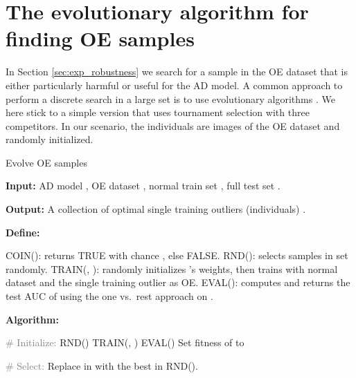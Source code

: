 \documentclass[10pt]{article} \usepackage[accepted]{stylefiles/tmlr}
\newcommand{\algcom}[1]{\textcolor{gray}{\# {#1}}}
\begin{document}
\section{The evolutionary algorithm for finding OE samples} \label{appx:evol_algo}

In Section \ref{sec:exp_robustness} we search for a sample in the OE dataset that is either particularly harmful or useful for the AD model. 
A common approach to perform a discrete search in a large set is to use evolutionary algorithms \citep{yu2010introduction, fortin2012deap}.
We here stick to a simple version that uses tournament selection \citep{blickle1995mathematical} with three competitors.
In our scenario, the individuals are images of the OE dataset and randomly initialized.

\begin{algorithm}[H]
    \footnotesize
    \caption{Evolve OE samples}
    \label{alg:evolve}
    
    \textbf{Input:} AD model , OE dataset , normal train set , full test set . \hfill \hphantom{1em}
    
    \textbf{Output:} A collection of optimal single training outliers (individuals) . \hfill \hphantom{1em}
    
    \textbf{Define:} 
    \begin{algorithmic}
        \STATE COIN(): returns TRUE with chance , else FALSE.
        \STATE RND(): selects  samples in set  randomly. 
        \STATE TRAIN(, ): randomly initializes 's weights, then trains  with normal dataset  and the single training outlier  as OE.
        \STATE EVAL(): computes and returns the test AUC of  using the one vs.~rest approach on .
    \end{algorithmic} 
    \vspace{1em}

    \textbf{Algorithm:} 
    \begin{algorithmic}
        \STATE \algcom{Initialize:}
        \STATE   RND()
        \FORALL{}
            \STATE TRAIN(, )
            \STATE  EVAL()
            \STATE Set fitness of  to 
        \ENDFOR
        \vspace{0.5em}
        
        \vspace{0.5em}
        
            \STATE \algcom{Select:}
            \STATE 
            \FORALL{}
                \STATE Replace  in  with the best in RND(). 
            \ENDFOR
            \STATE 
            \vspace{0.5em}
            

\end{algorithmic}
\end{algorithm}
\end{document}
